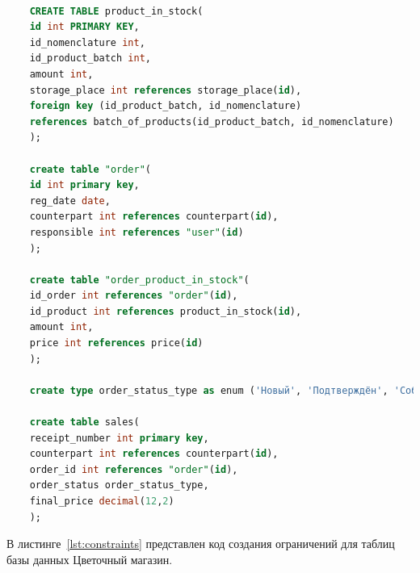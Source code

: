 \begin{lstlisting}[label=lst:creation_of_tables, caption=Создание таблиц базы данных, language=SQL]
	
	CREATE TABLE product_in_stock(
	id int PRIMARY KEY,
	id_nomenclature int,
	id_product_batch int,
	amount int,
	storage_place int references storage_place(id),
	foreign key (id_product_batch, id_nomenclature) 
	references batch_of_products(id_product_batch, id_nomenclature)
	);
	
	create table "order"(
	id int primary key,
	reg_date date,
	counterpart int references counterpart(id),
	responsible int references "user"(id)
	);
	
	create table "order_product_in_stock"(
	id_order int references "order"(id),
	id_product int references product_in_stock(id),
	amount int,
	price int references price(id)
	);
	
	create type order_status_type as enum ('Новый', 'Подтверждён', 'Собран', 'Получен');
	
	create table sales(
	receipt_number int primary key,
	counterpart int references counterpart(id),
	order_id int references "order"(id),
	order_status order_status_type,
	final_price decimal(12,2)
	);
\end{lstlisting}
В листинге~\ref{lst:constraints} представлен код создания ограничений для таблиц базы данных Цветочный магазин.
